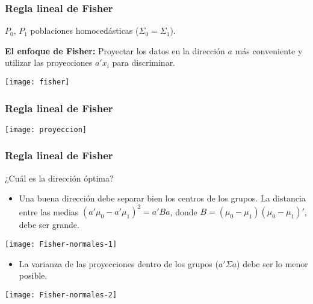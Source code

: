 \documentclass{beamer}
\begin{document}
\begin{frame}[plain]
\frametitle{Regla lineal de Fisher}

$P_0$, $P_1$ poblaciones homocedásticas ($\Sigma_0=\Sigma_1$).
\medskip

\textbf{El enfoque de Fisher:} Proyectar los datos en la direcci\'{o}n $a$ m\'{a}s conveniente  y
utilizar las proyecciones $a'x_i$ para discriminar.


\centerline{{\texttt{[image: fisher]}}}



\end{frame}
\begin{frame}[plain]
\frametitle{Regla lineal de Fisher}

\vspace{-1.7 cm}

\centerline{{\texttt{[image: proyeccion]}}}

\end{frame}
\begin{frame}
\frametitle{Regla lineal de Fisher}

¿Cuál es la direcci\'{o}n \'{o}ptima?

\begin{itemize}
  \item Una buena direcci\'{o}n debe separar bien los centros de los grupos. La distancia entre las medias $(a'\mu_0-a'\mu_1)^2 = a'Ba$, donde $B=(\mu_0-\mu_1)(\mu_0-\mu_1)'$, debe ser grande.
\end{itemize}
\centerline{{\texttt{[image: Fisher-normales-1]}}}
\vspace{-2mm}

\begin{itemize}
  \item La varianza de las proyecciones dentro de los grupos ($a'\Sigma a$) debe ser lo menor
  posible.
\end{itemize}
\centerline{{\texttt{[image: Fisher-normales-2]}}}


\end{frame}
\end{document}
